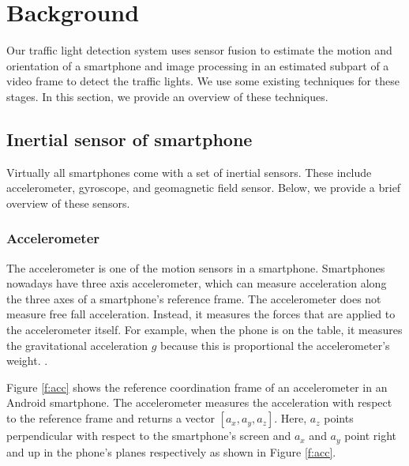 \chapter{Background}
\label{c:background}
Our traffic light detection system uses sensor fusion to estimate the motion and orientation of a smartphone and image processing in an estimated subpart of a video frame to detect the traffic lights. 
We use some existing techniques for these stages. 
In this section, we provide an overview of these techniques. 


\section{Inertial sensor of smartphone}
Virtually all smartphones come with a set of inertial sensors. These include accelerometer, gyroscope, and geomagnetic field sensor. 
Below, we provide a brief overview of these sensors. 


\subsection{Accelerometer}
The accelerometer is one of the motion sensors in a smartphone.
Smartphones nowadays have three axis accelerometer, which can measure acceleration along the three axes of a smartphone's reference frame.
The accelerometer does not measure free fall acceleration.
Instead, it measures the forces that are applied to the accelerometer itself.
For example, when the phone is on the table, it measures the gravitational acceleration $g$ because this is proportional the accelerometer's weight.
.

Figure \ref{f:acc} shows the reference coordination frame of an accelerometer in an Android smartphone.
The accelerometer measures the acceleration with respect to the reference frame and returns a vector $[a_x, a_y, a_z]$.
Here, $a_z$ points perpendicular with respect to the smartphone's screen and $a_x$ and $a_y$ point right and up in the phone's planes respectively as shown in Figure \ref{f:acc}.


